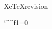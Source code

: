 
\begingroup

\expandafter\ifx\csname XeTeXrevision\endcsname\relax
\else

  \lccode`\^^f1=0
  \let\PATTERNS=\patterns
  \def\patterns{%
    \ifnum\lccode`\^^f1=0 %
      \lccode`\^^f1=`\^^f1 %
      \PATTERNS{1^^f1a 1^^f1e 1^^f1o 1^^f1i 1^^f1u}%
    \fi
    \PATTERNS
  }

\fi



\endgroup
\endinput
